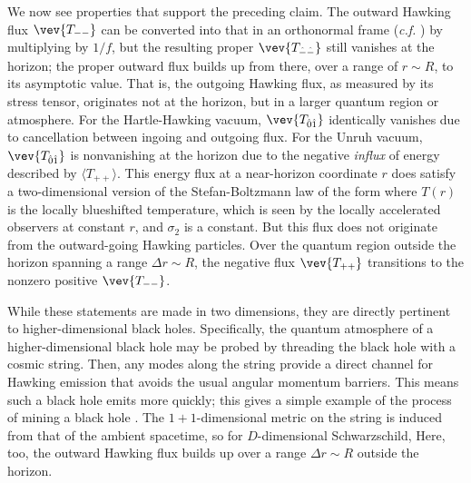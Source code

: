 We now see properties that support the preceding claim.  The outward Hawking flux $\vev{T_{--}}$ can be converted into that in an orthonormal frame ({\it c.f.} \tdmet) by multiplying by $1/f$, but the resulting proper $\vev{T_{\hat -\hat -}}$ still vanishes at the horizon; the proper outward flux builds up from there, over a range of $r\sim R$, to its asymptotic value.
That is, the outgoing Hawking flux, as measured by its stress tensor, originates not at the horizon, but in a larger quantum region or atmosphere.  
For the Hartle-Hawking vacuum, $\vev{T_{\hat0\hat1}}$ identically vanishes due to cancellation between ingoing and outgoing flux. 
For the Unruh vacuum, $\vev{T_{\hat0\hat1}}$ is nonvanishing at the horizon  due to the negative {\it influx}     of energy described by $\langle T_{++}\rangle$.  This energy flux at a near-horizon coordinate $r$ does satisfy a two-dimensional version of the Stefan-Boltzmann law of the form
%
\eqn{}
%
 where $T(r)$ is the locally blueshifted temperature, which is seen by the locally accelerated observers at constant $r$, and $\sigma_2$ is a constant.  But this flux does not originate from the outward-going Hawking particles.   Over the quantum region outside the horizon spanning a range $\Delta r\sim R$, the negative flux $\vev{T_{++}}$ transitions to the nonzero positive $\vev{T_{--}}$.  

While these statements are made in two dimensions, they are directly pertinent to higher-dimensional black holes.  Specifically, the quantum atmosphere of a higher-dimensional black hole may be probed by threading the black hole with a cosmic string.  Then, any modes along the string provide a direct channel for Hawking emission that avoids the usual angular momentum barriers.  This means such a black hole emits more quickly; this gives a simple example of the process of mining a black hole .  The $1+1$-dimensional metric on the string is induced from that of the ambient spacetime, so for $D$-dimensional Schwarzschild,
%
\eqn{}
%
Here, too, the outward Hawking flux builds up over a range  $\Delta r\sim R$ outside the horizon.

